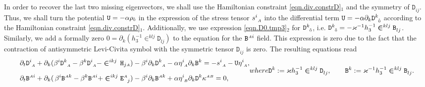 \documentclass[
10pt, %
a4paper, %
oneside, %
headinclude,footinclude, %
BCOR5mm, %
]{scrartcl}
\newcommand{\sA}{\mathsmaller A}
\newcommand{\sB}{\mathsmaller B}
\newcommand{\pd}[1]{\partial_{#1}}
\newcommand{\MG}[1]{\kappa^{#1}}			%
\newcommand{\tetrsymbol}{h}
\newcommand{\itetrsymbol}{\eta}
\newcommand{\itetr}[2]{\itetrsymbol^{#1}_{\phantom{#1}#2}}
\newcommand{\stress}[2]{s_{\ #1}^{#2}}
\newcommand{\detTetr}{\tetrsymbol}
\newcommand{\Dfin}[2]{\mathtt{D}_{\phantom{#2}#1}^{#2}}	%
\newcommand{\Hfin}[2]{\mathtt{H}_{#2#1}}	%
\newcommand{\Efin}[2]{\mathtt{E}^{#1}_{\phantom{#1}#2}}	%
\newcommand{\Ufin}{\mathtt{U}}
\newcommand{\Bfin}[2]{\mathtt{B}^{#1#2}}	%
\newcommand{\Bfinmix}[2]{\mathtt{B}^{#1}_{\phantom{#1}#2}}	%
\newcommand{\LCsymb}{\bm{\in}}    %
\newcommand{\indalg}[1]{\hat{\mathsmaller{#1}}}
\newcommand{\lapse}{\alpha}
\newcommand{\shift}[1]{\beta^{#1}}
\begin{document}
In order to recover the last two missing eigenvectors, we shall use the Hamiltonian constraint 
\eqref{eqn.div.constrD}$ _1 $ and the symmetry of $ \Dfin{ij}{} $. Thus, we shall turn the potential $ 
\Ufin =-\lapse \rho_{\indalg{0}} $ in the expression of the stress tensor $ \stress{\sA}{i} $ 
into the 
differential term $ \Ufin =-\lapse \pd{k}\Dfin{\indalg{0}}{k} $ according to the Hamiltonian constraint 
\eqref{eqn.div.constrD}$ _1 $. Additionally, we use expression \eqref{eqn.D0.tmp3}$_2$ for $ 
\Dfin{\indalg{0}}{k} $, i.e. $  \Dfin{\indalg{0}}{k} = -\varkappa^{-1}\detTetr_3^{-1} 
\LCsymb^{klj}\Bfinmix{}{lj}$. Similarly, we add a formally zero $ 0 = \pd{k}(\detTetr_3^{-1} 
\LCsymb^{klj} \Dfin{lj}{}) $ to the equation for the $ \Bfin{\sA}{i} $ field. This expression is zero 
due to the fact that the contraction of antisymmetric Levi-Civita symbol with the symmetric 
tensor $ 
\Dfin{ij}{} $ is zero. The resulting equations read
\begin{subequations}\label{eqn.BD.alt2}
	\begin{align}
		\pd{t} \Dfin{\sA}{i} + \pd{k}(\shift{i} 
		\Dfin{\sA}{k} - \shift{k}\Dfin{\sA}{i}  - \LCsymb^{ikj} \,
		\Hfin{\sA}{j}) 
		-\shift{i}\pd{k} \Dfin{\sA}{k}
		&
		-\lapse\itetr{i}{\sA}\pd{k} \Bfin{k}{} 
		= - \stress{\sA}{i} - \Ufin \itetr{i}{\sA},
		\label{eqn.BD.alt2.D}
		\\[2mm]
		\pd{t} \Bfin{\sA}{i} + \pd{k}(\,\shift{i} 
		\Bfin{\sA}{k} - \shift{k}\Bfin{\sA}{i}  + \LCsymb^{ikj} 
		\Efin{\sA}{j}) 
		-\shift{i}\pd{k} \Bfin{\sA}{k}
		&
		+\lapse\itetr{i}{\sB}\pd{k}\Dfin{}{k} 
		 \MG{\sA\sB}
		= 0,
	\end{align}
where 
	\begin{align}
		\label{eqn.BD.alt2.B}
		\Dfin{}{k} := \varkappa\detTetr_3^{-1} \LCsymb^{klj} \Dfin{lj}{},
		\qquad
		\Bfin{k}{} := \varkappa^{-1}\detTetr_3^{-1} \LCsymb^{klj} \Bfinmix{}{lj}.
	\end{align}
\end{subequations}
\end{document}
